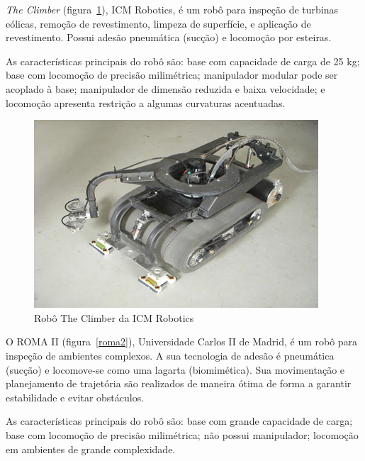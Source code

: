 \emph{The Climber} (figura~\ref{icm}), ICM Robotics, é um robô para inspeção de
turbinas eólicas, remoção de revestimento, limpeza de superfície, e aplicação de revestimento.
Possui adesão pneumática (sucção) e locomoção por esteiras. 

As características principais do robô são: base com capacidade de carga de 25
kg; base com locomoção de precisão milimétrica; manipulador modular pode ser
acoplado à base; manipulador de dimensão reduzida e baixa velocidade; e
locomoção apresenta restrição a algumas curvaturas acentuadas.

\begin{figure}[ht]
\centering
\includegraphics[width=\columnwidth]{sota/figs/climbers/icm.png}
\caption{Robô The Climber da ICM Robotics}
\label{icm}
\end{figure}

O ROMA II (figura~\ref{roma2}), Universidade Carlos II de Madrid, é um robô para
inspeção de ambientes complexos. A sua tecnologia de adesão é pneumática (sucção) e
locomove-se como uma lagarta (biomimética). Sua movimentação e planejamento de
trajetória são realizados de maneira ótima de forma a garantir estabilidade e
evitar obstáculos. 

As características principais do robô são: base com grande capacidade de carga;
base com locomoção de precisão milimétrica; não possui manipulador; locomoção em
ambientes de grande complexidade.

